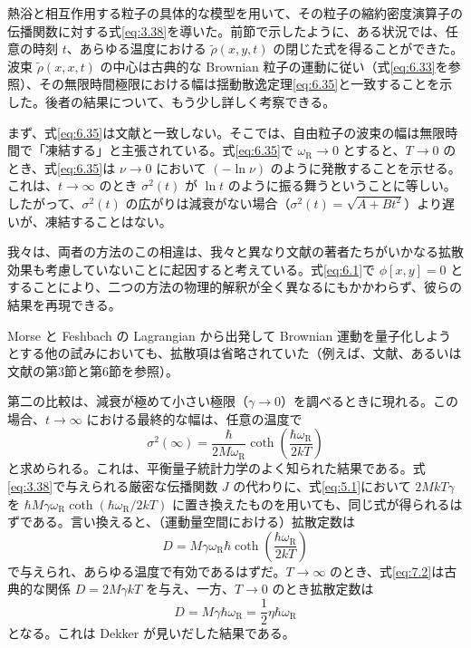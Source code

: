 \label{sec:7}
熱浴と相互作用する粒子の具体的な模型を用いて、その粒子の縮約密度演算子の伝播関数に対する式\eqref{eq:3.38}を導いた。前節で示したように、ある状況では、任意の時刻 $t$、あらゆる温度における $\tilde\rho(x,y,t)$ の閉じた式を得ることができた。波束 $\tilde\rho(x,x,t)$ の中心は古典的な Brownian 粒子の運動に従い（式\eqref{eq:6.33}を参照）、その無限時間極限における幅は揺動散逸定理\eqref{eq:6.35}と一致することを示した。後者の結果について、もう少し詳しく考察できる。

まず、式\eqref{eq:6.35}は文献\cite{ref27}と一致しない。そこでは、自由粒子の波束の幅は無限時間で「凍結する」と主張されている。式\eqref{eq:6.35}で $\omega_{\mathrm R}\to0$ とすると、$T\to0$ のとき、式\eqref{eq:6.35}は $\nu\to0$ において $(-\ln\nu)$ のように発散することを示せる。これは、$t\to\infty$ のとき $\sigma^2(t)$ が $\ln t$ のように振る舞うということに等しい。したがって、$\sigma^2(t)$ の広がりは減衰がない場合（$\sigma^2(t)=\sqrt{A+Bt^2}$）より遅いが、凍結することはない。

我々は、両者の方法のこの相違は、我々と異なり文献\cite{ref27}の著者たちがいかなる拡散効果も考慮していないことに起因すると考えている。式\eqref{eq:6.1}で $\phi[x,y]=0$ とすることにより、二つの方法の物理的解釈が全く異なるにもかかわらず、彼らの結果を再現できる。

Morse と Feshbach の Lagrangian から出発して Brownian 運動を量子化しようとする他の試みにおいても、拡散項は省略されていた（例えば、文献\cite{ref33,ref34}、あるいは文献\cite{ref35}の第3節と第6節を参照）。

第二の比較は、減衰が極めて小さい極限（$\gamma\to0$）を調べるときに現れる。この場合、$t\to\infty$ における最終的な幅は、任意の温度で
\begin{equation}
\sigma^2(\infty)=\frac{\hbar}{2M\omega_{\mathrm R}}
\coth\!\left(\frac{\hbar\omega_{\mathrm R}}{2kT}\right)
\tag{7.1}\label{eq:7.1}
\end{equation}
と求められる。これは、平衡量子統計力学のよく知られた結果である\cite{ref22}。式\eqref{eq:3.38}で与えられる厳密な伝播関数 $J$ の代わりに、式\eqref{eq:5.1}において $2MkT\gamma$ を $\hbar M\gamma\omega_{\mathrm R}\coth(\hbar\omega_{\mathrm R}/2kT)$ に置き換えたものを用いても、同じ式が得られるはずである。言い換えると、（運動量空間における）拡散定数は
\begin{equation}
D=M\gamma\omega_{\mathrm R}\hbar
\coth\!\left(\frac{\hbar\omega_{\mathrm R}}{2kT}\right)
\tag{7.2}\label{eq:7.2}
\end{equation}
で与えられ、あらゆる温度で有効であるはずだ。$T\to\infty$ のとき、式\eqref{eq:7.2}は古典的な関係 $D=2M\gamma kT$ を与え、一方、$T\to0$ のとき拡散定数は
\begin{equation}
D=M\gamma\hbar\omega_{\mathrm R}=\frac12\eta\hbar\omega_{\mathrm R}
\tag{7.3}\label{eq:7.3}
\end{equation}
となる。これは Dekker\cite{ref07} が見いだした結果である。

